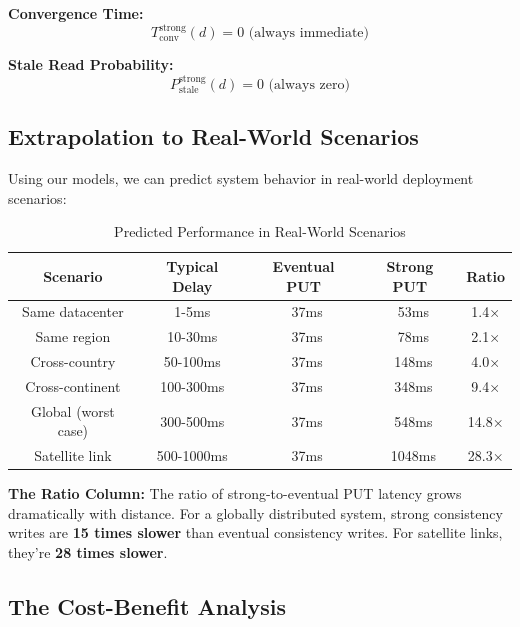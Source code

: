 \documentclass[10pt,a4paper]{article}
\begin{document}
\textbf{Convergence Time:}
\begin{equation}
T_{\text{conv}}^{\text{strong}}(d) = 0 \text{ (always immediate)}
\end{equation}

\textbf{Stale Read Probability:}
\begin{equation}
P_{\text{stale}}^{\text{strong}}(d) = 0 \text{ (always zero)}
\end{equation}

\subsection{Extrapolation to Real-World Scenarios}

Using our models, we can predict system behavior in real-world deployment scenarios:

\begin{table}[H]
\centering
\caption{Predicted Performance in Real-World Scenarios}
\begin{tabular}{|c|c|c|c|c|}
\hline
\textbf{Scenario} & \textbf{Typical Delay} & \textbf{Eventual PUT} & \textbf{Strong PUT} & \textbf{Ratio} \\
\hline
Same datacenter & 1-5ms & ~37ms & ~53ms & 1.4× \\
Same region & 10-30ms & ~37ms & ~78ms & 2.1× \\
Cross-country & 50-100ms & ~37ms & ~148ms & 4.0× \\
Cross-continent & 100-300ms & ~37ms & ~348ms & 9.4× \\
Global (worst case) & 300-500ms & ~37ms & ~548ms & 14.8× \\
Satellite link & 500-1000ms & ~37ms & ~1048ms & 28.3× \\
\hline
\end{tabular}
\end{table}

\textbf{The Ratio Column:} The ratio of strong-to-eventual PUT latency grows dramatically with distance. For a globally distributed system, strong consistency writes are \textbf{15 times slower} than eventual consistency writes. For satellite links, they're \textbf{28 times slower}.

\subsection{The Cost-Benefit Analysis}
\end{document}
